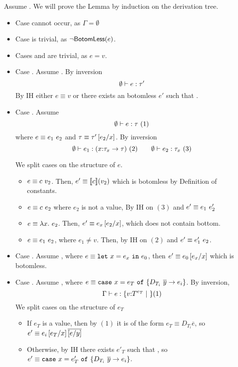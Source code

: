 Assume .
We will prove the Lemma by induction on the derivation tree.
\begin{itemize}
\item Case \rtvar cannot occur, as $\Gamma = \emptyset$
\item Case \rtbot is trivial, 
		as $\lnot \botomless{e}$.
\item Cases \rtconst and \rtfun are trivial, 
		as $e = v$.
\item Case \rtsub. Assume .
By inversion
$$	\hastype{\emptyset}{e}{\tau'}$$
By IH 
either $e \equiv v$ or there exists an botomless $e'$ such that .
\item Case \rtapp. Assume $$\hastype{\emptyset}{e}{\tau}\ (1)$$
where $e\equiv\eapp{e_1}{e_2}$ and $\tau\equiv\tau'\sub{x}{e_2}$.
By inversion
$$
	\hastype{\emptyset}{e_1}{(\tfun{x}{\tau_{x}}{\tau})}\ (2)\qquad
	\hastype{\emptyset}{e_2}{\tau_{x}}\ (3)
$$

We split cases on the structure of $e$.
\begin{itemize}
\item $e\equiv \eapp{c}{v_2}$.
Then, $e'\equiv\interp{c}(v_2)$ which is botomless by Definition of constants.

\item $e\equiv \eapp{c}{e_2}$ where $e_2$ is not a value, 
By IH on $(3)$  and  $e' \equiv \eapp{e_1}{e_2'}$

\item $e \equiv \eapp{\efun{x}{e_x}}{e_2}$.
Then, $e' \equiv e_x\sub{x}{e_2}$, which does not contain bottom.

\item $e \equiv \eapp{e_1}{e_2}$, where $e_1 \neq v$.
Then, by IH on $(2)$  and 
$e'\equiv\eapp{e_1'}{e_2}$.
\end{itemize}

\item Case \rtlet. Assume , where 
$e \equiv \elet{x}{e_x}{e_0}$, then $e'\equiv e_0\sub{x}{e_x}$ which is botomless.

\item Case \rtcase. Assume , where
$e \equiv \ecase{e_T}{D_{T_i}}{\overline{y}}{e_i}{x}$.
By inversion, 
$$
	\hastype{\Gamma}{e}{\tref{v}{T}{e_T}}\ (1)
$$
We split cases on the structure of $e_T$
\begin{itemize}
\item If $e_T$ is a value, then by $(1)$ it is of the form $e_T \equiv D_{T_i} \overline{e}$,
so $e' \equiv e_i \sub{x}{e_T}\overline{\sub{y}{e}} $
\item Otherwise, by IH there exists $e'_T$ such that , 
so $e' \equiv \ecase{e'_T}{D_{T_i}}{\overline{y}}{e_i}{x}$.
\end{itemize}
\end{itemize}